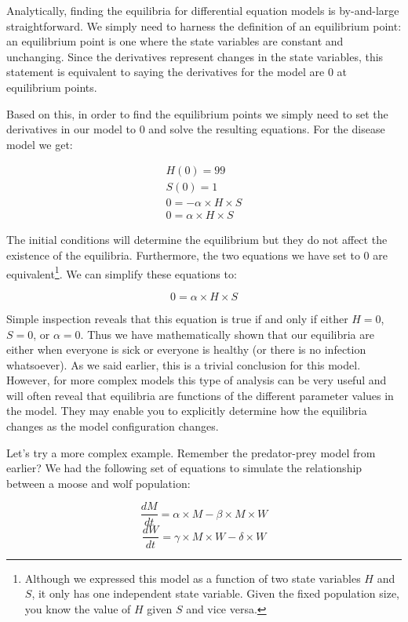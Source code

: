\documentclass[]{memoir}
\begin{document}
Analytically, finding the equilibria for differential equation models is
by-and-large straightforward. We simply need to harness the definition
of an equilibrium point: an equilibrium point is one where the state
variables are constant and unchanging. Since the derivatives represent
changes in the state variables, this statement is equivalent to saying
the derivatives for the model are 0 at equilibrium points.

Based on this, in order to find the equilibrium points we simply need to
set the derivatives in our model to 0 and solve the resulting equations.
For the disease model we get:

\[
\begin{aligned}
H(0) = 99 \\
S(0) = 1 \\
0 = - \alpha \times H \times S \\ 
0 = \alpha \times H \times S
\end{aligned}
\]

The initial conditions will determine the equilibrium but they do not
affect the existence of the equilibria. Furthermore, the two equations
we have set to 0 are equivalent\footnote{Although we expressed this
  model as a function of two state variables $H$ and $S$, it only has
  one independent state variable. Given the fixed population size, you
  know the value of $H$ given $S$ and vice versa.}. We can simplify
these equations to:

\[ 
0 = \alpha \times H \times S
\]

Simple inspection reveals that this equation is true if and only if
either $H=0$, $S=0$, or $\alpha=0$. Thus we have mathematically shown
that our equilibria are either when everyone is sick or everyone is
healthy (or there is no infection whatsoever). As we said earlier, this
is a trivial conclusion for this model. However, for more complex models
this type of analysis can be very useful and will often reveal that
equilibria are functions of the different parameter values in the model.
They may enable you to explicitly determine how the equilibria changes
as the model configuration changes.

Let's try a more complex example. Remember the predator-prey model from
earlier? We had the following set of equations to simulate the
relationship between a moose and wolf population:

\[ \frac{dM}{dt} = \alpha \times M - \beta \times M \times W \]
\[ \frac{dW}{dt} = \gamma \times M \times W - \delta \times W  \]
\end{document}
